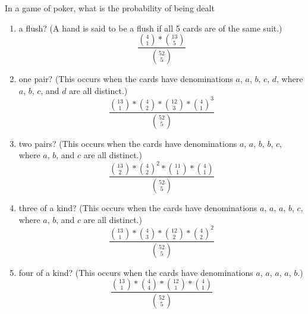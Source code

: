 \item In a game of poker, what is the probability of being dealt
\begin{enumerate}
    \item a flush? (A hand is said to be a flush if all 5 cards are of the same suit.)
    \[ \frac{\binom{4}{1} * \binom{13}{5}}{\binom{52}{5}} \]
    \item one pair? (This occurs when the cards have denominations $a$, $a$, $b$, $c$, $d$, where $a$, $b$, $c$, and $d$ are all distinct.)
    \[ \frac{\binom{13}{1} * \binom{4}{2} * \binom{12}{3} * \binom{4}{1}^3}{\binom{52}{5}} \]
    \item two pairs? (This occurs when the cards have denominations $a$, $a$, $b$, $b$, $c$, where $a$, $b$, and $c$ are all distinct.)
    \[ \frac{\binom{13}{2} * \binom{4}{2}^2 * \binom{11}{1} * \binom{4}{1}}{\binom{52}{5}} \]
    \item three of a kind? (This occurs when the cards have denominations $a$, $a$, $a$, $b$, $c$, where $a$, $b$, and $c$ are all distinct.)
    \[ \frac{\binom{13}{1} * \binom{4}{3} * \binom{12}{2} * \binom{4}{2}^2}{\binom{52}{5}} \]
    \item four of a kind? (This occurs when the cards have denominations $a$, $a$, $a$, $a$, $b$.)
    \[ \frac{\binom{13}{1} * \binom{4}{4} * \binom{12}{1} * \binom{4}{1}}{\binom{52}{5}} \]
\end{enumerate}